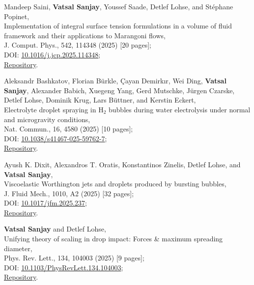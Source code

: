 \begin{enumerate}[leftmargin=1.5em,label=\textbf{[\arabic*]}]
	\item Mandeep Saini, \textbf{Vatsal Sanjay}, Youssef Saade, Detlef Lohse, and Stéphane Popinet,\\
	Implementation of integral surface tension formulations in a volume of fluid framework and their applications to Marangoni flows,\\
	J. Comput. Phys., 542, 114348 (2025) [20 pages];\\
	\faFile\hspace{0.2em}DOI: \href{https://doi.org/10.1016/j.jcp.2025.114348}{10.1016/j.jcp.2025.114348};\\
	\faGithub\hspace{0.2em}\href{https://github.com/comphy-lab/marangoniSheet}{Repository}.

	\item Aleksandr Bashkatov, Florian Bürkle, Çayan Demirkır, Wei Ding, \textbf{Vatsal Sanjay}, Alexander Babich, Xuegeng Yang, Gerd Mutschke, Jürgen Czarske, Detlef Lohse, Dominik Krug, Lars Büttner, and Kerstin Eckert,\\
	Electrolyte droplet spraying in H$_2$ bubbles during water electrolysis under normal and microgravity conditions,\\
	Nat. Commun., 16, 4580 (2025) [10 pages];\\
	\faFile\hspace{0.2em}DOI: \href{https://doi.org/10.1038/s41467-025-59762-7}{10.1038/s41467-025-59762-7};\\
	\faGithub\hspace{0.2em}\href{https://github.com/VatsalSy/Asymmetries-in-coalescence}{Repository}.

	\item Ayush K. Dixit, Alexandros T. Oratis, Konstantinos Zinelis, Detlef Lohse, and \textbf{Vatsal Sanjay},\\
	Viscoelastic Worthington jets and droplets produced by bursting bubbles,\\
	J. Fluid Mech., 1010, A2 (2025) [32 pages];\\
	\faFile\hspace{0.2em}DOI: \href{https://doi.org/10.1017/jfm.2025.237}{10.1017/jfm.2025.237};\\
	\faGithub\hspace{0.2em}\href{https://github.com/comphy-lab/Viscoelastic-Worthington-jets-and-droplets-produced-by-bursting-bubbles}{Repository}.

	\item \textbf{Vatsal Sanjay} and Detlef Lohse,\\
	Unifying theory of scaling in drop impact: Forces \& maximum spreading diameter,\\
	Phys. Rev. Lett., 134, 104003 (2025) [9 pages];\\
	\faFile\hspace{0.2em}DOI: \href{https://doi.org/10.1103/PhysRevLett.134.104003}{10.1103/PhysRevLett.134.104003};\\
	\faGithub\hspace{0.2em}\href{https://github.com/comphy-lab/Drop-Impact}{Repository}.


\end{enumerate}
